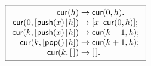 \documentclass[11pt]{article}
\begin{document}
\TeXtoEPS
\(
\boxed{
\begin{array}{r@{\;}c@{\;}l}
\fun{cur}(h) & \rightarrow & \fun{cur}(0,h).\\
\fun{cur}(0,\cons{\fun{push}(x)}{h}) & \rightarrow
                                     & \cons{x}{\fun{cur}(0,h)};\\
\fun{cur}(k,\cons{\fun{push}(x)}{h}) & \rightarrow & \fun{cur}(k-1,h);\\
\fun{cur}(k,\cons{\fun{pop}()}{h}) & \rightarrow & \fun{cur}(k+1,h);\\
\fun{cur}(k,\el)         & \rightarrow & \el.
\end{array}}
\)
\endTeXtoEPS
\end{document}
